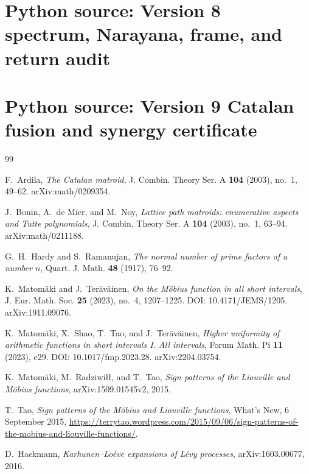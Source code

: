 \documentclass[11pt]{amsart}
\numberwithin{equation}{section}
\theoremstyle{plain}
\theoremstyle{definition}
\theoremstyle{remark}
\begin{document}
\section{Python source: Version 8 spectrum, Narayana, frame, and return audit}


\section{Python source: Version 9 Catalan fusion and synergy certificate}


\begin{thebibliography}{99}

F.~Ardila,
\emph{The Catalan matroid},
J. Combin. Theory Ser. A \textbf{104} (2003), no.~1, 49--62.
arXiv:math/0209354.

J.~Bonin, A.~de Mier, and M.~Noy,
\emph{Lattice path matroids: enumerative aspects and Tutte polynomials},
J. Combin. Theory Ser. A \textbf{104} (2003), no.~1, 63--94.
arXiv:math/0211188.

G.~H.~Hardy and S.~Ramanujan,
\emph{The normal number of prime factors of a number $n$},
Quart. J. Math. \textbf{48} (1917), 76--92.

K.~Matom\"aki and J.~Ter\"av\"ainen,
\emph{On the M\"obius function in all short intervals},
J. Eur. Math. Soc. \textbf{25} (2023), no.~4, 1207--1225.
DOI: 10.4171/JEMS/1205.
arXiv:1911.09076.

K.~Matom\"aki, X.~Shao, T.~Tao, and J.~Ter\"av\"ainen,
\emph{Higher uniformity of arithmetic functions in short intervals I.
All intervals},
Forum Math. Pi \textbf{11} (2023), e29.
DOI: 10.1017/fmp.2023.28.
arXiv:2204.03754.

K.~Matom\"aki, M.~Radziwi\l\l, and T.~Tao,
\emph{Sign patterns of the Liouville and M\"obius functions},
arXiv:1509.01545v2, 2015.

T.~Tao,
\emph{Sign patterns of the M\"obius and Liouville functions},
What's New, 6 September 2015,
\url{https://terrytao.wordpress.com/2015/09/06/sign-patterns-of-the-mobius-and-liouville-functions/}.

D.~Hackmann,
\emph{Karhunen--Lo\`eve expansions of L\'evy processes},
arXiv:1603.00677, 2016.


\end{thebibliography}
\end{document}
